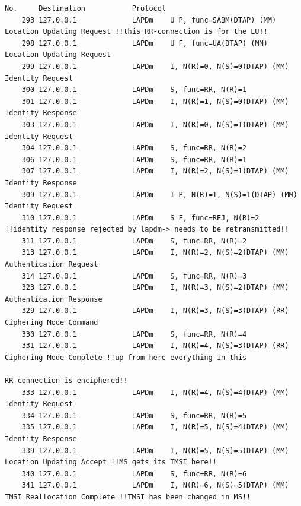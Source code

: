 \begin{lstlisting}[caption={[Aufgezeichneter Nachrichtenverkehr mit E-plus BTS, lang]Aufgezeichneter Nachrichtenverkehr mit E-plus \ac{BTS}, detailliert (mit \ac{LAPDm}-Kontrollnachrichten), generiert mit Filtern aus Wireshark-Mitschnitt}, label={lst:real_bts_traffic_det_wireshark}, boxpos=c, frame=single, language=bytetxt, numbers=none, basicstyle=\tiny\ttfamily, tabsize=1 ]
No.     Destination           Protocol 
    293 127.0.0.1             LAPDm    U P, func=SABM(DTAP) (MM) Location Updating Request !!this RR-connection is for the LU!!
    298 127.0.0.1             LAPDm    U F, func=UA(DTAP) (MM) Location Updating Request 
    299 127.0.0.1             LAPDm    I, N(R)=0, N(S)=0(DTAP) (MM) Identity Request 
    300 127.0.0.1             LAPDm    S, func=RR, N(R)=1
    301 127.0.0.1             LAPDm    I, N(R)=1, N(S)=0(DTAP) (MM) Identity Response 
    303 127.0.0.1             LAPDm    I, N(R)=0, N(S)=1(DTAP) (MM) Identity Request 
    304 127.0.0.1             LAPDm    S, func=RR, N(R)=2
    306 127.0.0.1             LAPDm    S, func=RR, N(R)=1
    307 127.0.0.1             LAPDm    I, N(R)=2, N(S)=1(DTAP) (MM) Identity Response 
    309 127.0.0.1             LAPDm    I P, N(R)=1, N(S)=1(DTAP) (MM) Identity Request 
    310 127.0.0.1             LAPDm    S F, func=REJ, N(R)=2 !!identity response rejected by lapdm-> needs to be retransmitted!!
    311 127.0.0.1             LAPDm    S, func=RR, N(R)=2
    313 127.0.0.1             LAPDm    I, N(R)=2, N(S)=2(DTAP) (MM) Authentication Request 
    314 127.0.0.1             LAPDm    S, func=RR, N(R)=3
    323 127.0.0.1             LAPDm    I, N(R)=3, N(S)=2(DTAP) (MM) Authentication Response 
    329 127.0.0.1             LAPDm    I, N(R)=3, N(S)=3(DTAP) (RR) Ciphering Mode Command 
    330 127.0.0.1             LAPDm    S, func=RR, N(R)=4
    331 127.0.0.1             LAPDm    I, N(R)=4, N(S)=3(DTAP) (RR) Ciphering Mode Complete !!up from here everything in this
                                                                                            RR-connection is enciphered!!
    333 127.0.0.1             LAPDm    I, N(R)=4, N(S)=4(DTAP) (MM) Identity Request 
    334 127.0.0.1             LAPDm    S, func=RR, N(R)=5
    335 127.0.0.1             LAPDm    I, N(R)=5, N(S)=4(DTAP) (MM) Identity Response 
    339 127.0.0.1             LAPDm    I, N(R)=5, N(S)=5(DTAP) (MM) Location Updating Accept !!MS gets its TMSI here!!
    340 127.0.0.1             LAPDm    S, func=RR, N(R)=6
    341 127.0.0.1             LAPDm    I, N(R)=6, N(S)=5(DTAP) (MM) TMSI Reallocation Complete !!TMSI has been changed in MS!!

\end{lstlisting}
